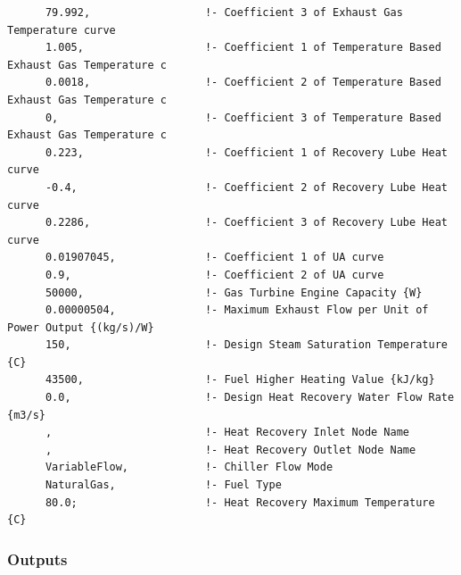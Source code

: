 \begin{lstlisting}
      79.992,                  !- Coefficient 3 of Exhaust Gas Temperature curve
      1.005,                   !- Coefficient 1 of Temperature Based Exhaust Gas Temperature c
      0.0018,                  !- Coefficient 2 of Temperature Based Exhaust Gas Temperature c
      0,                       !- Coefficient 3 of Temperature Based Exhaust Gas Temperature c
      0.223,                   !- Coefficient 1 of Recovery Lube Heat curve
      -0.4,                    !- Coefficient 2 of Recovery Lube Heat curve
      0.2286,                  !- Coefficient 3 of Recovery Lube Heat curve
      0.01907045,              !- Coefficient 1 of UA curve
      0.9,                     !- Coefficient 2 of UA curve
      50000,                   !- Gas Turbine Engine Capacity {W}
      0.00000504,              !- Maximum Exhaust Flow per Unit of Power Output {(kg/s)/W}
      150,                     !- Design Steam Saturation Temperature {C}
      43500,                   !- Fuel Higher Heating Value {kJ/kg}
      0.0,                     !- Design Heat Recovery Water Flow Rate {m3/s}
      ,                        !- Heat Recovery Inlet Node Name
      ,                        !- Heat Recovery Outlet Node Name
      VariableFlow,            !- Chiller Flow Mode
      NaturalGas,              !- Fuel Type
      80.0;                    !- Heat Recovery Maximum Temperature {C}
\end{lstlisting}

\subsubsection{Outputs}\label{outputs-7-006}

